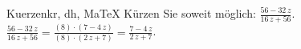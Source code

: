 \begin{MAufgabe}{Kuerzen}{kr, dh, MaTeX}
K\"urzen Sie soweit m\"oglich: $\frac{56 - 32\, z}{16\, z + 56}$.\\ 
\ifLsg\MLoesung
\quad $\frac{56 - 32\, z}{16\, z + 56}=\frac{(8)\cdot(7 - 4\, z)}{(8)\cdot(2\, z + 7)}=\frac{7 - 4\, z}{2\, z + 7}$.\else\relax\fi
 \end{MAufgabe}